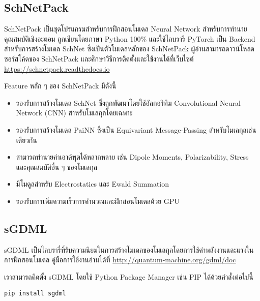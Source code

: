 \subsection{SchNetPack}
\label{ssec:lib_schnetpack}

SchNetPack เป็นชุดโปรแกรมสำหรับการฝึกสอนโมเดล Neural Network สำหรับการทำนายคุณสมบัติเชิงอะตอม\autocite{schutt2019}
ถูกเขียนโดยภาษา Python 100\% และใช้ไลบรารี PyTorch เป็น Backend สำหรับการสร้างโมเดล SchNet ซึ่งเป็นตัวโมเดลหลักของ SchNetPack
ผู้อ่านสามารถดาวน์โหลดซอร์สโค้ดของ SchNetPack และศึกษาวิธีการติดตั้งและใช้งานได้ที่เว็บไซต์ \url{https://schnetpack.readthedocs.io}

\noindent Feature หลัก ๆ ของ SchNetPack มีดังนี้

\begin{itemize}
    \item รองรับการสร้างโมเดล SchNet ซึ่งถูกพัฒนาโดยใช้อัลกอริทึม Convolutional Neural Network (CNN) สำหรับโมเลกุลโดยเฉพาะ%
    \autocite{schutt2017,schutt2017a}
    
    \item รองรับการสร้างโมเดล PaiNN ซึ่งเป็น Equivariant Message-Passing สำหรับโมเลกุลเช่นเดียวกัน\autocite{schutt2021}
    
    \item สามารถทำนายค่าเอาต์พุตได้หลากหลาย เช่น Dipole Moments, Polarizability, Stress และคุณสมบัติอื่น ๆ ของโมเลกุล
    
    \item มีโมดูลสำหรับ Electrostatics และ Ewald Summation
    
    \item รองรับการเพิ่มความเร็วการคำนวณและฝึกสอนโมเดลด้วย GPU
\end{itemize}

\subsection{sGDML}
\label{ssec:lib_sgdml}

sGDML เป็นไลบรารี่ที่รับความนิยมในการสร้างโมเดลของโมเลกุลโดยการใช้ค่าพลังงานและแรงในการฝึกสอนโมเดล\autocite{chmiela2019}
คู่มือการใช้งานอ่านได้ที่ \url{http://quantum-machine.org/gdml/doc}

\noindent เราสามารถติดตั้ง sGDML โดยใช้ Python Package Manager เช่น PIP ได้ด้วยคำสั่งต่อไปนี้

\begin{lstlisting}[style=MyBash]
pip install sgdml
\end{lstlisting}

